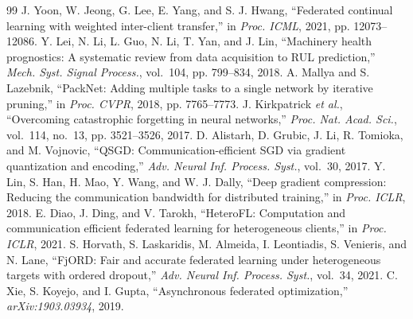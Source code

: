 \documentclass[journal]{IEEEtran}
\begin{document}
\begin{thebibliography}{99}
 J. Yoon, W. Jeong, G. Lee, E. Yang, and S. J. Hwang, ``Federated continual learning with weighted inter-client transfer,'' in \emph{Proc. ICML}, 2021, pp. 12073--12086.
 Y. Lei, N. Li, L. Guo, N. Li, T. Yan, and J. Lin, ``Machinery health prognostics: A systematic review from data acquisition to RUL prediction,'' \emph{Mech. Syst. Signal Process.}, vol.~104, pp. 799--834, 2018.
 A. Mallya and S. Lazebnik, ``PackNet: Adding multiple tasks to a single network by iterative pruning,'' in \emph{Proc. CVPR}, 2018, pp. 7765--7773.
 J. Kirkpatrick \emph{et al.}, ``Overcoming catastrophic forgetting in neural networks,'' \emph{Proc. Nat. Acad. Sci.}, vol.~114, no.~13, pp. 3521--3526, 2017.
 D. Alistarh, D. Grubic, J. Li, R. Tomioka, and M. Vojnovic, ``QSGD: Communication-efficient SGD via gradient quantization and encoding,'' \emph{Adv. Neural Inf. Process. Syst.}, vol.~30, 2017.
 Y. Lin, S. Han, H. Mao, Y. Wang, and W. J. Dally, ``Deep gradient compression: Reducing the communication bandwidth for distributed training,'' in \emph{Proc. ICLR}, 2018.
 E. Diao, J. Ding, and V. Tarokh, ``HeteroFL: Computation and communication efficient federated learning for heterogeneous clients,'' in \emph{Proc. ICLR}, 2021.
 S. Horvath, S. Laskaridis, M. Almeida, I. Leontiadis, S. Venieris, and N. Lane, ``FjORD: Fair and accurate federated learning under heterogeneous targets with ordered dropout,'' \emph{Adv. Neural Inf. Process. Syst.}, vol.~34, 2021.
 C. Xie, S. Koyejo, and I. Gupta, ``Asynchronous federated optimization,'' \emph{arXiv:1903.03934}, 2019.

\end{thebibliography}
\end{document}
